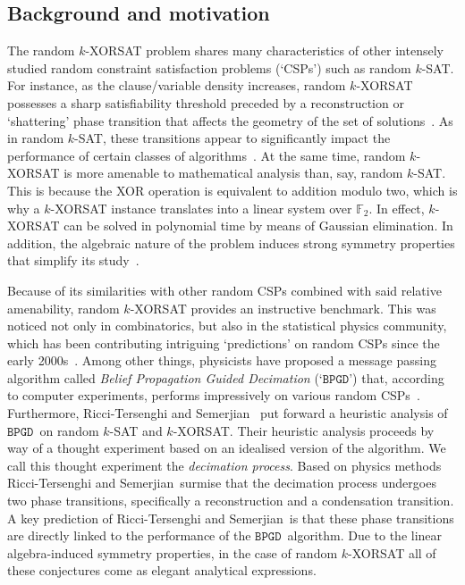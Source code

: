 \documentclass[10pt,reqno]{amsart}
\numberwithin{equation}{section}
\newcommand{\RTS}{Ricci-Tersenghi and Semerjian}
\newcommand{\BPGD}{\ensuremath{\mathtt{BPGD}}}
\newcommand\FF{\mathbb{F}}
\begin{document}
\subsection{Background and motivation}\label{sec_background}
The random $k$-XORSAT problem shares many characteristics of other intensely studied random constraint satisfaction problems (`CSPs') such as random $k$-SAT.
For instance, as the clause/variable density increases, random $k$-XORSAT possesses a sharp satisfiability threshold preceded by a reconstruction or `shattering' phase transition that affects the geometry of the set of solutions~\cite{AchlioptasMolloy,DuboisMandler,pnas,PittelSorkin}.
As in random $k$-SAT, these transitions appear to significantly impact the performance of certain classes of algorithms~\cite{BetterAlg,Ibrahimi}.
At the same time, random $k$-XORSAT is more amenable to mathematical analysis than, say, random $k$-SAT.
This is because the XOR operation is equivalent to addition modulo two, which is why a $k$-XORSAT instance translates into a linear system over $\FF_2$.
In effect, $k$-XORSAT can be solved in polynomial time by means of Gaussian elimination.
In addition, the algebraic nature of the problem induces strong symmetry properties that simplify its study~\cite{Ayre}.

Because of its similarities with other random CSPs combined with said relative amenability, random $k$-XORSAT provides an instructive benchmark.
This was noticed not only in combinatorics, but also in the statistical physics community, which has been contributing intriguing `predictions' on random CSPs since the early 2000s~\cite{MM,MRTZ}.
Among other things, physicists have proposed a message passing algorithm called {\em Belief Propagation Guided Decimation} (`\BPGD') that, according to computer experiments, performs impressively on various random CSPs~\cite{MPZ}.
Furthermore, \RTS~\cite{RTS} put forward a heuristic analysis of \BPGD\ on random $k$-SAT and $k$-XORSAT.
Their heuristic analysis proceeds by way of a thought experiment based on an idealised version of the algorithm.
We call this thought experiment the {\em decimation process}.
Based on physics methods \RTS\ surmise that the decimation process undergoes two phase transitions, specifically a reconstruction and a condensation transition.
A key prediction of \RTS\ is that these phase transitions are directly linked to the performance of the \BPGD\ algorithm.
Due to the linear algebra-induced symmetry properties, in the case of random $k$-XORSAT all of these conjectures come as elegant analytical expressions.
\end{document}
